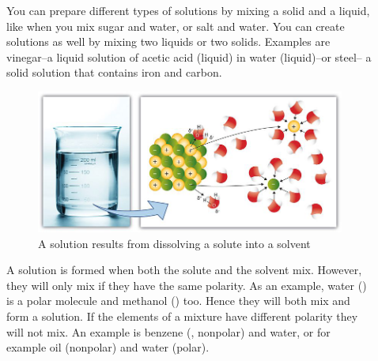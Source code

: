 \documentclass[main.tex]{subfiles}
\begin{document}
\begin{description}
\item[] You can prepare different types of solutions by mixing a solid and a liquid, like when you mix sugar and water, or salt and water. You can create solutions as well by mixing two liquids or two solids. Examples are vinegar--a liquid solution of acetic acid (liquid) in water (liquid)--or steel-- a solid solution that contains iron and carbon. 
\begin{figure}[h]%
\includegraphics{chapter9/figure3}
\caption{A solution results from dissolving a solute into a solvent}
\end{figure}%
\item[] A solution is formed when both the solute and the solvent mix. However, they will only mix if they have the same polarity. As an example, water () is a polar molecule and methanol () too. Hence they will both mix and form a solution. If the elements of a mixture have different polarity they will not mix. An example is benzene (, nonpolar) and water, or for example oil (nonpolar) and water (polar). 


\end{description}
\end{document}
